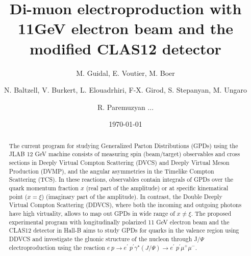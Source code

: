 \documentclass[superscriptaddress,preprintnumbers,amsmath,amssymb,12pt]{revtex4}
\newcommand{\JLAB}{Thomas Jefferson National Accelerator Facility, Newport News, Virginia 23606}
\begin{document}
\vspace{1.cm}

\title{Di-muon electroproduction with 11GeV electron beam and the modified CLAS12 detector}

\author{M. Guidal, E. Voutier, M. Boer} 
\author{N. Baltzell, V. Burkert, L. Elouadrhiri, F-X. Girod, S. Stepanyan, M. Ungaro} 
\author{R. Paremuzyan  ...}

\date{\today}


\begin{abstract}
The current program for studying Generalized Parton Distributions (GPDs) using the JLAB 12 GeV machine consists of measuring spin (beam/target) observables and cross sections in Deeply Virtual Compton Scattering (DVCS) and Deeply Virtual Meson Production (DVMP), and the angular asymmetries in the Timelike Compton Scattering (TCS). In these reactions, observables contain integrals of GPDs over the quark momentum fraction $x$ (real part of the amplitude) or at specific kinematical point ($x=\xi$) (imaginary part of the amplitude). In contrast, the Double Deeply Virtual Compton Scattering (DDVCS), where both the incoming and outgoing photons have high virtuality, allows to map out GPDs in wide range of $x\ne \xi$. The proposed experimental program with longitudinally polarized 11 GeV electron beam and the CLAS12 detector in Hall-B aims to study GPDs for quarks in the valence region using DDVCS and investigate the gluonic structure of the nucleon through J/$\Psi$ electroproduction using the reaction $e ~p\to e^\prime ~p^\prime \gamma^\star(J/\Psi)\to e^\prime ~p^\prime \mu^+\mu^-$. 


\end{abstract}

\maketitle
\end{document}
